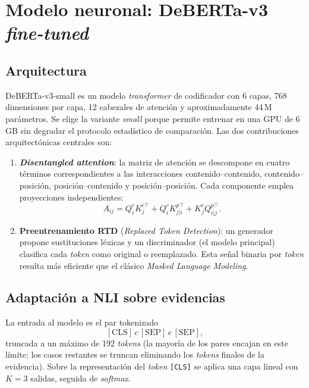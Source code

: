 \chapter{Modelo neuronal: DeBERTa-v3 \emph{fine-tuned}}\label{cap:deberta}

\section{Arquitectura}

DeBERTa-v3-small \citep{he2023debertav3} es un modelo \emph{transformer}
de codificador con 6 capas, 768 dimensiones por capa, 12 cabezales de
atención y aproximadamente 44\,M parámetros. Se elige la variante
\emph{small} porque permite entrenar en una GPU de 6\,GB sin degradar
el protocolo estadístico de comparación. Las dos contribuciones
arquitectónicas centrales son:

\begin{enumerate}[leftmargin=*,itemsep=0.2em]
  \item \textbf{\emph{Disentangled attention}}: la matriz de atención
        se descompone en cuatro términos correspondientes a las
        interacciones contenido--contenido, contenido--posición,
        posición--contenido y posición--posición. Cada componente
        emplea proyecciones independientes:
        \[
          A_{ij} = Q^c_i K^{c\top}_j + Q^c_i K^{p\top}_{j|i} +
                   K^c_j Q^{p\top}_{i|j}.
        \]
  \item \textbf{Preentrenamiento RTD} (\emph{Replaced Token
        Detection}): un generador propone sustituciones léxicas y un
        discriminador (el modelo principal) clasifica cada \emph{token}
        como original o reemplazado. Esta señal binaria por
        \emph{token} resulta más eficiente que el clásico
        \emph{Masked Language Modeling}.
\end{enumerate}

\section{Adaptación a NLI sobre evidencias}

La entrada al modelo es el par tokenizado
\[
  [\text{CLS}]\, c \,[\text{SEP}]\, e \,[\text{SEP}],
\]
truncada a un máximo de 192 \emph{tokens} (la mayoría de los pares
encajan en este límite; los casos restantes se truncan eliminando los
\emph{tokens} finales de la evidencia). Sobre la representación del
\emph{token} \texttt{[CLS]} se aplica una capa lineal con $K = 3$
salidas, seguida de \emph{softmax}.

